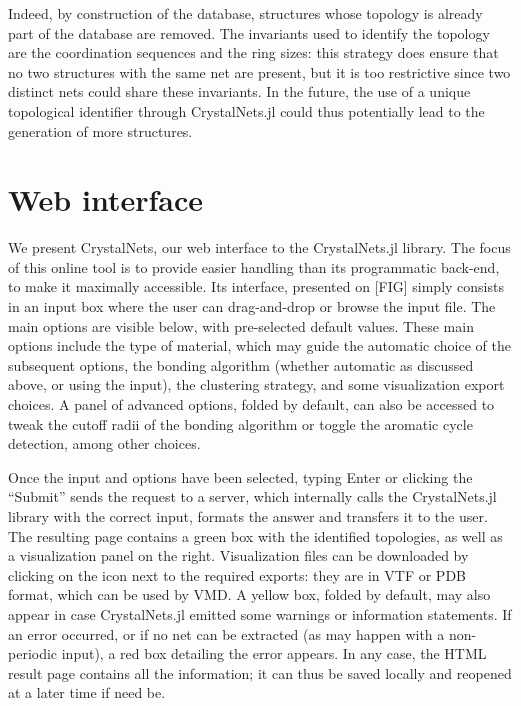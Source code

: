 \documentclass[main.tex]{subfiles}
\begin{document}
Indeed, by construction of the database, structures whose topology is already part of the database are removed. The invariants used to identify the topology are the coordination sequences and the ring sizes: this strategy does ensure that no two structures with the same net are present, but it is too restrictive since two distinct nets could share these invariants. In the future, the use of a unique topological identifier through CrystalNets.jl could thus potentially lead to the generation of more structures.

\section{Web interface}


We present CrystalNets, our web interface to the CrystalNets.jl library. The focus of this online tool is to provide easier handling than its programmatic back-end, to make it maximally accessible. Its interface, presented on [FIG] simply consists in an input box where the user can drag-and-drop or browse the input file. The main options are visible below, with pre-selected default values. These main options include the type of material, which may guide the automatic choice of the subsequent options, the bonding algorithm (whether automatic as discussed above, or using the input), the clustering strategy, and some visualization export choices.
A panel of advanced options, folded by default, can also be accessed to tweak the cutoff radii of the bonding algorithm or toggle the aromatic cycle detection, among other choices.

Once the input and options have been selected, typing Enter or clicking the ``Submit'' sends the request to a server, which internally calls the CrystalNets.jl library with the correct input, formats the answer and transfers it to the user. The resulting page contains a green box with the identified topologies, as well as a visualization panel on the right.
Visualization files can be downloaded by clicking on the icon next to the required  exports: they are in VTF or PDB format, which can be used by VMD.
A yellow box, folded by default, may also appear in case CrystalNets.jl emitted some warnings or information statements.
If an error occurred, or if no net can be extracted (as may happen with a non-periodic input), a red box detailing the error appears.
In any case, the HTML result page contains all the information; it can thus be saved locally and reopened at a later time if need be.\\
\end{document}
